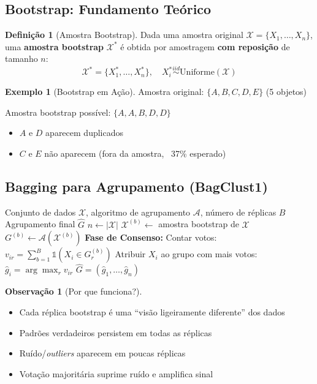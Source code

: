\documentclass[12pt,a4paper]{article}
\theoremstyle{definition}
\newtheorem{definicao}{Definição}[section]
\newtheorem{exemplo}{Exemplo}[section]
\newtheorem{observacao}{Observação}[section]
\begin{document}
\subsection{Bootstrap: Fundamento Teórico}

\begin{definicao}[Amostra Bootstrap]
Dada uma amostra original $\mathcal{X} = \{X_1, \ldots, X_n\}$, uma \textbf{amostra bootstrap} $\mathcal{X}^*$ é obtida por amostragem \textbf{com reposição} de tamanho $n$:
\[
\mathcal{X}^* = \{X_1^*, \ldots, X_n^*\}, \quad X_i^* \overset{iid}{\sim} \text{Uniforme}(\mathcal{X})
\]
\end{definicao}

\begin{exemplo}[Bootstrap em Ação]
Amostra original: $\{A, B, C, D, E\}$ (5 objetos)

Amostra bootstrap possível: $\{A, A, B, D, D\}$
\begin{itemize}
    \item $A$ e $D$ aparecem duplicados
    \item $C$ e $E$ não aparecem (fora da amostra, ~37\% esperado)
\end{itemize}
\end{exemplo}

\subsection{Bagging para Agrupamento (BagClust1)}

\begin{algorithm}[H]
\caption{BagClust1 para Formas 3D}
\begin{algorithmic}[1]
\Require Conjunto de dados $\mathcal{X}$, algoritmo de agrupamento $\mathcal{A}$, número de réplicas $B$
\Ensure Agrupamento final $\hat{G}$
\State $n \gets |\mathcal{X}|$
    \State $\mathcal{X}^{(b)} \gets$ amostra bootstrap de $\mathcal{X}$
    \State $G^{(b)} \gets \mathcal{A}(\mathcal{X}^{(b)})$ 
\EndFor
\State \textbf{Fase de Consenso:}
    \State Contar votos: $v_{ir} = \sum_{b=1}^B \mathbb{1}(X_i \in G_r^{(b)})$
    \State Atribuir $X_i$ ao grupo com mais votos: $\hat{g}_i = \arg\max_r v_{ir}$
\EndFor
\State \Return $\hat{G} = (\hat{g}_1, \ldots, \hat{g}_n)$
\end{algorithmic}
\end{algorithm}

\begin{observacao}[Por que funciona?]
\begin{itemize}
    \item Cada réplica bootstrap é uma ``visão ligeiramente diferente'' dos dados
    \item Padrões verdadeiros persistem em todas as réplicas
    \item Ruído/\textit{outliers} aparecem em poucas réplicas
    \item Votação majoritária suprime ruído e amplifica sinal
\end{itemize}
\end{observacao}
\end{document}
